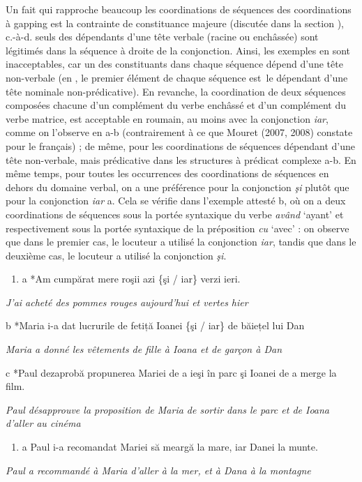 Un fait qui rapproche beaucoup les coordinations de séquences des coordinations à gapping est la contrainte de constituance majeure (discutée dans la section ), c.-à-d. seuls des dépendants d'une tête verbale (racine ou enchâssée) sont légitimés dans la séquence à droite de la conjonction. Ainsi, les exemples en  sont inacceptables, car un des constituants dans chaque séquence dépend d'une tête non-verbale (en , le premier élément de chaque séquence est~le dépendant d'une tête nominale non-prédicative). En revanche, la coordination de deux séquences composées chacune d'un complément du verbe enchâssé et d'un complément du verbe matrice, est acceptable en roumain, au moins avec la conjonction \textit{iar}, comme on l'observe en a-b (contrairement à ce que Mouret (2007, 2008) constate pour le français) ; de même, pour les coordinations de séquences dépendant d'une tête non-verbale, mais prédicative dans les structures à prédicat complexe a-b. En même temps, pour toutes les occurrences des coordinations de séquences en dehors du domaine verbal, on a une préférence pour la conjonction \textit{şi} plutôt que pour la conjonction \textit{iar} a. Cela se vérifie dans l'exemple attesté b, où on a deux coordinations de séquences sous la portée syntaxique du verbe \textit{având} `ayant' et respectivement sous la portée syntaxique de la préposition \textit{cu} `avec' : on observe que dans le premier cas, le locuteur a utilisé la conjonction \textit{iar}, tandis que dans le deuxième cas, le locuteur a utilisé la conjonction \textit{şi}.


\begin{enumerate}
\item \label{bkm:Ref290322901}a  *Am cumpărat mere roşii azi \{şi / iar\} verzi ieri.


\end{enumerate}
{\itshape
J'ai acheté des pommes rouges aujourd'hui et vertes hier}

  b  *Maria i-a dat lucrurile de fetiță Ioanei \{şi / iar\} de băiețel lui Dan

{\itshape
Maria a donné les vêtements de fille à Ioana et de garçon à Dan}

  c  *Paul dezaprobă propunerea Mariei de a ieşi în parc şi Ioanei de a merge la film.

    \textit{Paul désapprouve la proposition de Maria de sortir dans le parc et de Ioana d'aller au cinéma}


\begin{enumerate}
\item \label{bkm:Ref290323140}a  Paul i-a recomandat Mariei să meargă la mare, iar Danei la munte.


\end{enumerate}
{\itshape
Paul a recommandé à Maria d'aller à la mer, et à Dana à la montagne}

